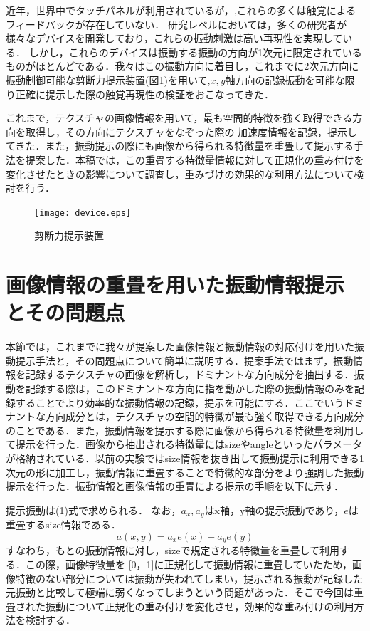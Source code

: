 \documentclass[a4paper]{jarticle}
\begin{document}
近年，世界中でタッチパネルが利用されているが，,これらの多くは触覚によるフィードバックが存在していない．
研究レベルにおいては，多くの研究者が様々なデバイスを開発しており，これらの振動刺激は高い再現性を実現している\cite{chubb2010shiverpad, konyo2008alternative}．
しかし，これらのデバイスは振動する振動の方向が1次元に限定されているものがほとんどである．我々はこの振動方向に着目し，これまでに2次元方向に振動制御可能な剪断力提示装置(図\ref{fig1})を用いて,$x,y$軸方向の記録振動を可能な限り正確に提示した際の触覚再現性の検証をおこなってきた\cite{kurogi2018}．\par
これまで，テクスチャの画像情報を用いて，最も空間的特徴を強く取得できる方向を取得し，その方向にテクスチャをなぞった際の
加速度情報を記録，提示してきた．また，振動提示の際にも画像から得られる特徴量を重畳して提示する手法を提案した．本稿では，この重畳する特徴量情報に対して正規化の重み付けを変化させたときの影響について調査し，重みづけの効果的な利用方法について検討を行う．
\begin{figure}[tb]
  \begin{center}
    \texttt{[image: device.eps]}
  \end{center}
  \vspace*{-6mm}
  \caption{剪断力提示装置}
  \label{fig1}
\end{figure}

\section{画像情報の重畳を用いた振動情報提示とその問題点}%

本節では，これまでに我々が提案した画像情報と振動情報の対応付けを用いた振動提示手法と，その問題点について簡単に説明する．提案手法ではまず，振動情報を記録するテクスチャの画像を解析し，ドミナントな方向成分を抽出する．振動を記録する際は，このドミナントな方向に指を動かした際の振動情報のみを記録することでより効率的な振動情報の記録，提示を可能にする．ここでいうドミナントな方向成分とは，テクスチャの空間的特徴が最も強く取得できる方向成分のことである\cite{Kurogi2018SI}．また，振動情報を提示する際に画像から得られる特徴量を利用して提示を行った．画像から抽出される特徴量にはsizeやangleといったパラメータが格納されている．以前の実験ではsize情報を抜き出して振動提示に利用できる1次元の形に加工し，振動情報に重畳することで特徴的な部分をより強調した振動提示を行った．振動情報と画像情報の重畳による提示の手順を以下に示す．


提示振動は(1)式で求められる．
なお，$a_x,a_y$はx軸，y軸の提示振動であり，$e$は重畳するsize情報である．
\begin{equation}
  a(x,y)=a_xe(x)+a_ye(y)
\end{equation}
すなわち，もとの振動情報に対し，sizeで規定される特徴量を重畳して利用する．この際，画像特徴量を [0，1]に正規化して振動情報に重畳していたため，画像特徴のない部分については振動が失われてしまい，提示される振動が記録した元振動と比較して極端に弱くなってしまうという問題があった．そこで今回は重畳された振動について正規化の重み付けを変化させ，効果的な重み付けの利用方法を検討する．
\end{document}
